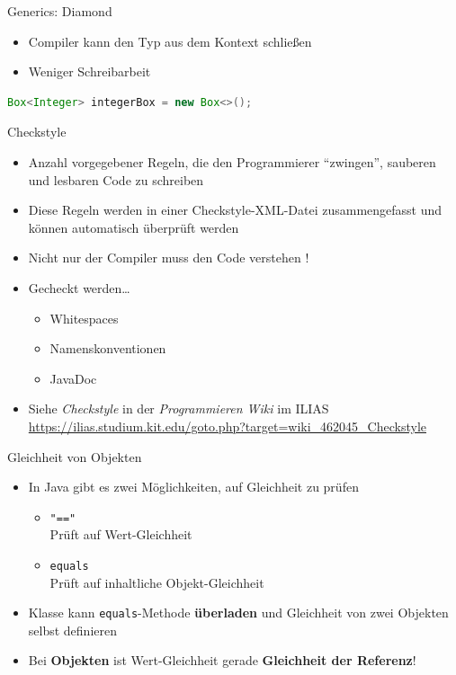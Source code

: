 \documentclass[18pt]{beamer}
\newcommand{\quotes}[1]{``#1''}
\begin{document}
\begin{frame}[fragile]{Generics: Diamond}
    \begin{itemize}
        \item Compiler kann den Typ aus dem Kontext schließen
        \item Weniger Schreibarbeit
    \end{itemize}
    \begin{lstlisting}[language=Java]
Box<Integer> integerBox = new Box<>();
    \end{lstlisting}

\end{frame}

\appendix
\beginbackup

\begin{frame}{Checkstyle}
    \begin{itemize}
        \item Anzahl vorgegebener Regeln, die den Programmierer \quotes{zwingen}, sauberen und lesbaren Code zu schreiben
        \item Diese Regeln werden in einer Checkstyle-XML-Datei zusammengefasst und können automatisch überprüft werden
        \item Nicht nur der Compiler muss den Code verstehen !
        \item Gecheckt werden\dots
        \begin{itemize}
            \item Whitespaces
            \item Namenskonventionen
            \item JavaDoc
        \end{itemize}
        \item Siehe \textit{Checkstyle} in der \textit{Programmieren Wiki} im ILIAS\\
        \url{https://ilias.studium.kit.edu/goto.php?target=wiki_462045_Checkstyle}
    \end{itemize}

\end{frame}

\begin{frame}{Gleichheit von Objekten}
    \begin{itemize}
        \item In Java gibt es zwei Möglichkeiten, auf Gleichheit zu prüfen
        \begin{itemize}
            \item \texttt{"=="}\\
            Prüft auf Wert-Gleichheit

            \item \texttt{equals}\\
            Prüft auf inhaltliche Objekt-Gleichheit
        \end{itemize}
        \item Klasse kann \texttt{equals}-Methode \textbf{überladen} und Gleichheit von zwei Objekten selbst definieren
        \item \alert{Bei \textbf{Objekten} ist Wert-Gleichheit gerade \textbf{Gleichheit der Referenz}!}
    \end{itemize}
\end{frame}
\end{document}
